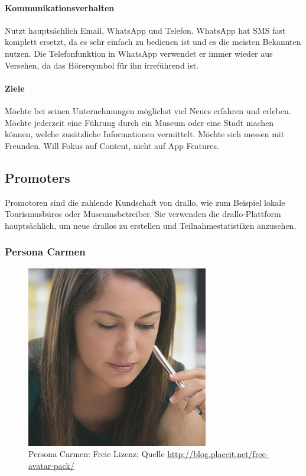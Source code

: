 \paragraph{Kommunikationsverhalten }

Nutzt hauptsächlich Email, WhatsApp und Telefon. WhatsApp hat SMS fast komplett ersetzt, da es sehr einfach zu bedienen ist und es die meisten Bekannten nutzen. Die Telefonfunktion in WhatsApp verwendet er immer wieder aus Versehen, da das Hörersymbol für ihn irreführend ist.\\ 

\paragraph{Ziele} 

Möchte bei seinen Unternehmungen möglichst viel Neues erfahren und erleben. Möchte jederzeit eine Führung durch ein Museum oder eine Stadt machen können, welche zusätzliche Informationen vermittelt. Möchte sich messen mit Freunden. Will Fokus auf Content, nicht auf App Features.\\

\subsection{Promoters}

Promotoren sind die zahlende Kundschaft von drallo, wie zum Beispiel lokale Tourismusbüros oder Museumsbetreiber. Sie verwenden die drallo-Plattform hauptsächlich, um neue drallos zu erstellen und Teilnahmestatistiken anzusehen.

\subsubsection{Persona Carmen}
\begin{figure}
	\includegraphics[width=.35\textwidth]{images/persona-carmen.jpg} 
	\caption{Persona Carmen: Freie Lizenz; Quelle \url{http://blog.placeit.net/free-avatar-pack/}}
	\label{fig:carmen}
\end{figure}



